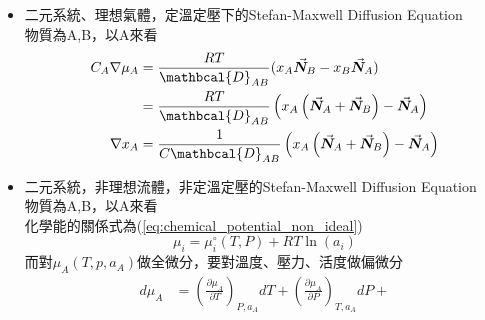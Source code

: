 \documentclass[../main.tex]{subfiles}
\begin{document}
\begin{itemize}
\begin{itemize}
\begin{align}
      \frac{C_i}{\frac{C_i}{C}} \nabla x_i &= \sum_{j\neq i} \frac{1}{\mathbcal{D}_{ij}}
      \left(x_i \vec{\bm N}_j - x_j \vec{\bm N}_i\right) \nonumber\\
      \implies \quad \nabla x_i &= \sum_{j\neq i} \frac{1}{C \mathbcal{D}_{ij}} \left(
        x_i \vec{\bm N}_j - x_j \vec{\bm N}_i
      \right) \label{eq:maxwell_stefan_diffusion_ideal_gas}
    \end{align}
    如果是二元系統，右邊的$(x_i \vec{\bm N}_j - x_j \vec{\bm N}_i)$可以合併成一個變數:
    \begin{align}
      x_A \vec{\bm N}_B - x_B \vec{\bm N}_A &= 
      \underbrace{x_A \vec{\bm N}_B}_A - \underbrace{x_A \vec{\bm N}_B}_B
      + \underbrace{x_A\vec{\bm N}_A}_A -\underbrace{ x_A \vec{\bm N}_A}_B \nonumber\\
      &= x_A \left(
        \vec{\bm N}_A + \vec{\bm N}_B
      \right) - \vec{\bm N}_A \left(
        x_A + x_B
      \right) \nonumber\\
      &= x_A \left(\vec{\bm N}_A + \vec{\bm N}_B\right) - \vec{\bm N}_A
    \end{align}
    \item 二元系統、理想氣體，定溫定壓下的Stefan-Maxwell Diffusion Equation\\
    物質為A,B，以A來看
    \begin{align}
      C_A \nabla \mu_A &= \frac{RT}{\mathbcal{D}_{AB}} (x_A \vec{\bm N}_B - x_B \vec{\bm N}_A) \nonumber\\
      & = \frac{RT}{\mathbcal{D}_{AB}} \left(x_A \left(\vec{\bm N}_A + \vec{\bm N}_B\right) - \vec{\bm N}_A\right) \\
      \nabla x_A &= \frac{1}{C \mathbcal{D}_{AB}} \left(
        x_A \left(\vec{\bm N}_A + \vec{\bm N}_B\right) - \vec{\bm N}_A
      \right)
    \end{align}
    \item 二元系統，非理想流體，非定溫定壓的Stefan-Maxwell Diffusion Equation\\
    物質為A,B，以A來看\\
    化學能的關係式為(\ref{eq:chemical_potential_non_ideal})
    \begin{equation}
      \mu_i = \mu_i^\circ(T,P) + RT \ln (a_i) 
    \end{equation}
    而對$\mu_A(T,p,a_A)$做全微分，要對溫度、壓力、活度做偏微分
    \begin{align}
      d\mu_A &= \left(\frac{\partial \mu_A}{\partial T}\right)_{P,a_A} dT +
      \left(\frac{\partial \mu_A}{\partial P}\right)_{T,a_A} dP +

\end{align}
\end{itemize}
\end{itemize}
\end{document}
